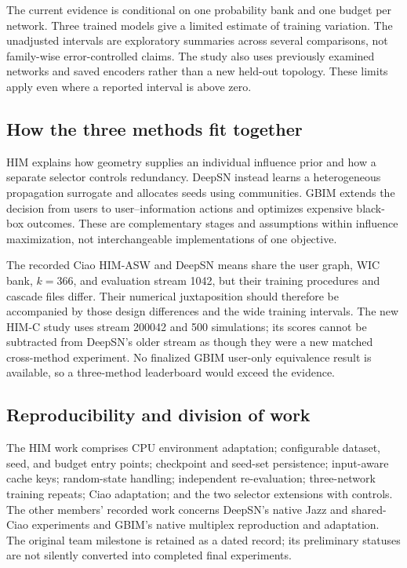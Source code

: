 \documentclass[10pt,twocolumn]{article}
\begin{document}
The current evidence is conditional on one probability bank and one budget per network. Three trained models give a limited estimate of training variation. The unadjusted intervals are exploratory summaries across several comparisons, not family-wise error-controlled claims. The study also uses previously examined networks and saved encoders rather than a new held-out topology. These limits apply even where a reported interval is above zero.

\subsection{How the three methods fit together}
HIM explains how geometry supplies an individual influence prior and how a separate selector controls redundancy. DeepSN instead learns a heterogeneous propagation surrogate and allocates seeds using communities. GBIM extends the decision from users to user--information actions and optimizes expensive black-box outcomes. These are complementary stages and assumptions within influence maximization, not interchangeable implementations of one objective.

The recorded Ciao HIM-ASW and DeepSN means share the user graph, WIC bank, $k=366$, and evaluation stream 1042, but their training procedures and cascade files differ. Their numerical juxtaposition should therefore be accompanied by those design differences and the wide training intervals. The new HIM-C study uses stream 200042 and 500 simulations; its scores cannot be subtracted from DeepSN's older stream as though they were a new matched cross-method experiment. No finalized GBIM user-only equivalence result is available, so a three-method leaderboard would exceed the evidence.

\subsection{Reproducibility and division of work}
The HIM work comprises CPU environment adaptation; configurable dataset, seed, and budget entry points; checkpoint and seed-set persistence; input-aware cache keys; random-state handling; independent re-evaluation; three-network training repeats; Ciao adaptation; and the two selector extensions with controls. The other members' recorded work concerns DeepSN's native Jazz and shared-Ciao experiments and GBIM's native multiplex reproduction and adaptation. The original team milestone is retained as a dated record; its preliminary statuses are not silently converted into completed final experiments.
\end{document}
